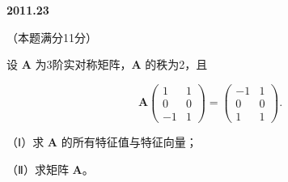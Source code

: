 \documentclass[UTF8,12pt,fontset=windows]{ctexart}
\begin{document}
\vfill
\newpage
{\large\bfseries 2011.23}

（本题满分11分）

设 $\boldsymbol{A}$ 为3阶实对称矩阵，$\boldsymbol{A}$ 的秩为2，且

$$
\boldsymbol{A}\begin{pmatrix} 1 & 1 \\ 0 & 0 \\ -1 & 1 \end{pmatrix} = \begin{pmatrix} -1 & 1 \\ 0 & 0 \\ 1 & 1 \end{pmatrix}.
$$

（Ⅰ）求 $\boldsymbol{A}$ 的所有特征值与特征向量；

（Ⅱ）求矩阵 $\boldsymbol{A}$。

\vfill
\end{document}
